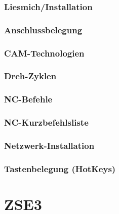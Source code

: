 \documentclass[a4paper]{book}
\begin{document}
	\section{Liesmich/Installation} 
	\section{Anschlussbelegung} 
	\section{CAM-Technologien} 
	\section{Dreh-Zyklen} 
	\section{NC-Befehle} 
	\section{NC-Kurzbefehlsliste} 
	\section{Netzwerk-Installation} 
	\section{Tastenbelegung (HotKeys)} 
 
 
\part{ZSE3}
\end{document}
